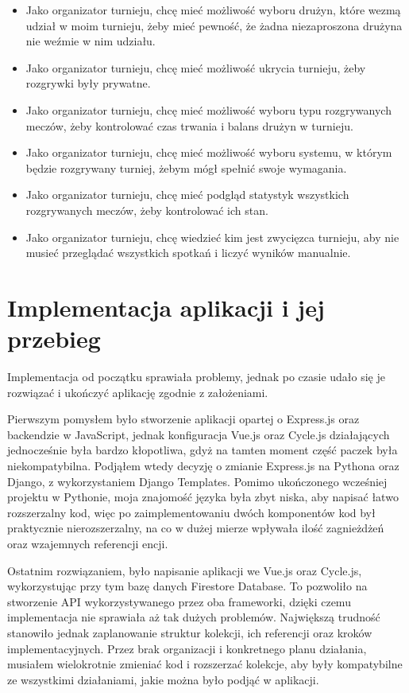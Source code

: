 \documentclass[shortabstract]{iithesis}
\theoremstyle{definition} \newtheorem{definition}{Definicja}[]
\theoremstyle{remark} \newtheorem{remark}[definition]{Observation}
\theoremstyle{plain} \newtheorem{theorem}[definition]{Theorem}
\theoremstyle{plain} \newtheorem{lemma}[definition]{Lemma}
\begin{document}
\begin{itemize}
    \item Jako organizator turnieju, chcę mieć możliwość wyboru drużyn, które wezmą udział w moim turnieju, żeby mieć pewność, że żadna niezaproszona drużyna nie weźmie w nim udziału.
    \item Jako organizator turnieju, chcę mieć możliwość ukrycia turnieju, żeby rozgrywki były prywatne.
    \item Jako organizator turnieju, chcę mieć możliwość wyboru typu rozgrywanych meczów, żeby kontrolować czas trwania i balans drużyn w turnieju.
    \item Jako organizator turnieju, chcę mieć możliwość wyboru systemu, w którym będzie rozgrywany turniej, żebym mógł spełnić swoje wymagania.
    \item Jako organizator turnieju, chcę mieć podgląd statystyk wszystkich rozgrywanych meczów, żeby kontrolować ich stan.
    \item Jako organizator turnieju, chcę wiedzieć kim jest zwycięzca turnieju, aby nie musieć przeglądać wszystkich spotkań i liczyć wyników manualnie.
\end{itemize}


\chapter{Implementacja aplikacji i jej przebieg}
Implementacja od początku sprawiała problemy, jednak po czasie udało się je rozwiązać i ukończyć aplikację zgodnie z założeniami.

Pierwszym pomysłem było stworzenie aplikacji opartej o Express.js oraz backendzie w JavaScript, jednak konfiguracja Vue.js oraz Cycle.js działających jednocześnie była bardzo kłopotliwa, gdyż na tamten moment część paczek była niekompatybilna. Podjąłem wtedy decyzję o zmianie Express.js na Pythona oraz Django, z wykorzystaniem Django Templates. Pomimo ukończonego wcześniej projektu w Pythonie, moja znajomość języka była zbyt niska, aby napisać łatwo rozszerzalny kod, więc po zaimplementowaniu dwóch komponentów kod był praktycznie nierozszerzalny, na co w dużej mierze wpływała ilość zagnieżdżeń oraz wzajemnych referencji encji.

Ostatnim rozwiązaniem, było napisanie aplikacji we Vue.js oraz Cycle.js, wykorzystując przy tym bazę danych Firestore Database. To pozwoliło na stworzenie API wykorzystywanego przez oba frameworki, dzięki czemu implementacja nie sprawiała aż tak dużych problemów. Największą trudność stanowiło jednak zaplanowanie struktur kolekcji, ich referencji oraz kroków implementacyjnych. Przez brak organizacji i konkretnego planu działania, musiałem wielokrotnie zmieniać kod i rozszerzać kolekcje, aby były kompatybilne ze wszystkimi działaniami, jakie można było podjąć w aplikacji.
\end{document}
